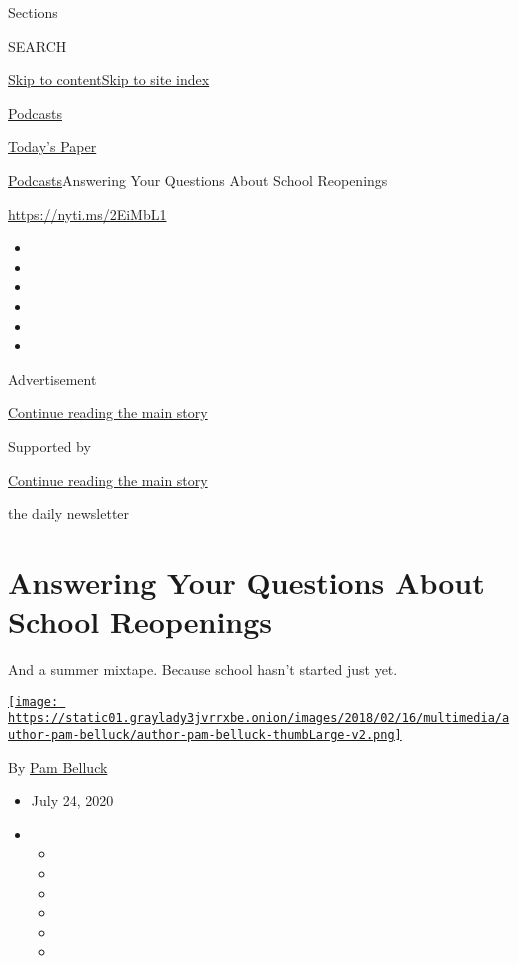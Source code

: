 Sections

SEARCH

\protect\hyperlink{site-content}{Skip to
content}\protect\hyperlink{site-index}{Skip to site index}

\href{https://www.nytimes3xbfgragh.onion/spotlight/podcasts}{Podcasts}

\href{https://myaccount.nytimes3xbfgragh.onion/auth/login?response_type=cookie\&client_id=vi}{}

\href{https://www.nytimes3xbfgragh.onion/section/todayspaper}{Today's
Paper}

\href{/spotlight/podcasts}{Podcasts}\textbar{}Answering Your Questions
About School Reopenings

\href{https://nyti.ms/2EiMbL1}{https://nyti.ms/2EiMbL1}

\begin{itemize}
\item
\item
\item
\item
\item
\item
\end{itemize}

Advertisement

\protect\hyperlink{after-top}{Continue reading the main story}

Supported by

\protect\hyperlink{after-sponsor}{Continue reading the main story}

the daily newsletter

\hypertarget{answering-your-questions-about-school-reopenings}{%
\section{Answering Your Questions About School
Reopenings}\label{answering-your-questions-about-school-reopenings}}

And a summer mixtape. Because school hasn't started just yet.

\href{https://www.nytimes3xbfgragh.onion/by/pam-belluck}{\texttt{[image: https://static01.graylady3jvrrxbe.onion/images/2018/02/16/multimedia/author-pam-belluck/author-pam-belluck-thumbLarge-v2.png]}}

By \href{https://www.nytimes3xbfgragh.onion/by/pam-belluck}{Pam Belluck}

\begin{itemize}
\item
  July 24, 2020
\item
  \begin{itemize}
  \item
  \item
  \item
  \item
  \item
  \item
  \end{itemize}
\end{itemize}

